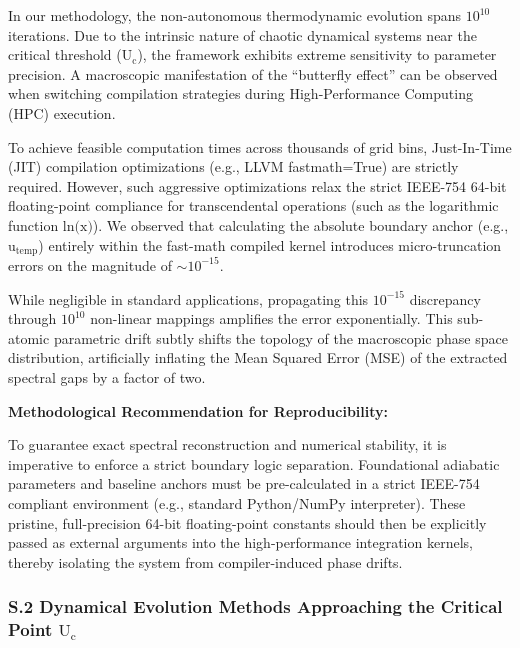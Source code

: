 In our methodology, the non-autonomous thermodynamic evolution spans
\(\text{10}^{\text{10}}\) iterations. Due to the intrinsic nature of
chaotic dynamical systems near the critical threshold
(\(\text{U}_{\text{c}}\)), the framework exhibits extreme sensitivity to
parameter precision. A macroscopic manifestation of the ``butterfly
effect'' can be observed when switching compilation strategies during
High-Performance Computing (HPC) execution.

To achieve feasible computation times across thousands of grid bins,
Just-In-Time (JIT) compilation optimizations (e.g., LLVM fastmath=True)
are strictly required. However, such aggressive optimizations relax the
strict IEEE-754 64-bit floating-point compliance for transcendental
operations (such as the logarithmic function
\(\text{ln(}\text{x}\text{)}\)). We observed that calculating the
absolute boundary anchor (e.g., \(\text{u}_{\text{temp}}\)) entirely
within the fast-math compiled kernel introduces micro-truncation errors
on the magnitude of \(\text{∼}\text{10}^{\text{−15}}\).

While negligible in standard applications, propagating this
\(\text{10}^{\text{−15}}\) discrepancy through \(\text{10}^{\text{10}}\)
non-linear mappings amplifies the error exponentially. This sub-atomic
parametric drift subtly shifts the topology of the macroscopic phase
space distribution, artificially inflating the Mean Squared Error (MSE)
of the extracted spectral gaps by a factor of two.

\textbf{Methodological Recommendation for Reproducibility:}

To guarantee exact spectral reconstruction and numerical stability, it
is imperative to enforce a strict boundary logic separation.
Foundational adiabatic parameters and baseline anchors must be
pre-calculated in a strict IEEE-754 compliant environment (e.g.,
standard Python/NumPy interpreter). These pristine, full-precision
64-bit floating-point constants should then be explicitly passed as
external arguments into the high-performance integration kernels,
thereby isolating the system from compiler-induced phase drifts.

\hypertarget{s.2-dynamical-evolution-methods-approaching-the-critical-point-textu_textc}{%
\subsubsection{\texorpdfstring{\textbf{S.2 Dynamical Evolution Methods
Approaching the Critical Point}
\(\text{U}_{\text{c}}\)}{S.2 Dynamical Evolution Methods Approaching the Critical Point \textbackslash text\{U\}\_\{\textbackslash text\{c\}\}}}\label{s.2-dynamical-evolution-methods-approaching-the-critical-point-textu_textc}}

